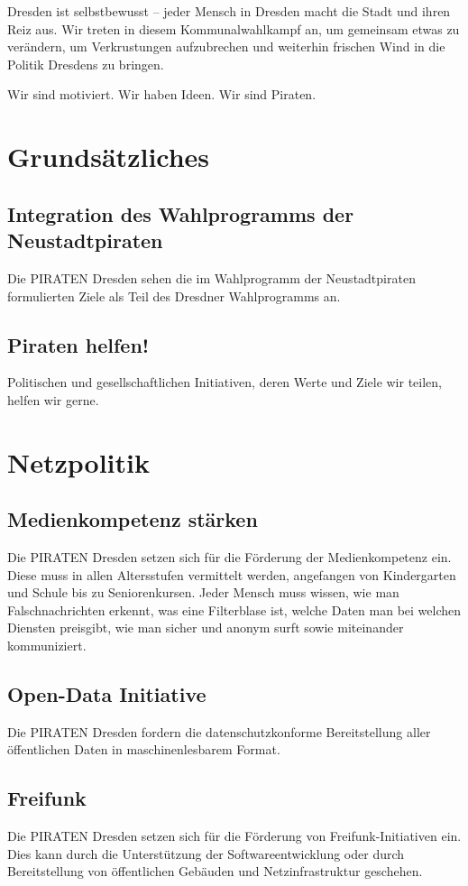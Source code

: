 \documentclass[a4paper, 11pt]{article}
\begin{document}
Dresden ist selbstbewusst – jeder Mensch in Dresden macht die Stadt und ihren Reiz aus. Wir treten in diesem Kommunalwahlkampf an, um gemeinsam etwas zu verändern, um Verkrustungen aufzubrechen und weiterhin frischen Wind in die Politik Dresdens zu bringen.\newline

Wir sind motiviert. Wir haben Ideen. Wir sind Piraten.

\section{Grundsätzliches}
\subsection{Integration des Wahlprogramms der Neustadtpiraten}
Die PIRATEN Dresden sehen die im Wahlprogramm der Neustadtpiraten formulierten Ziele als Teil des Dresdner Wahlprogramms an.

\subsection{Piraten helfen!}
Politischen und gesellschaftlichen Initiativen, deren Werte und Ziele wir teilen, helfen wir gerne.

\section{Netzpolitik}

\subsection{Medienkompetenz stärken}
Die PIRATEN Dresden setzen sich für die Förderung der Medienkompetenz ein. Diese muss in allen Altersstufen vermittelt werden, angefangen von Kindergarten und Schule bis zu Seniorenkursen. Jeder Mensch muss wissen, wie man Falschnachrichten erkennt, was eine Filterblase ist, welche Daten man bei welchen Diensten preisgibt, wie man sicher und anonym surft sowie miteinander kommuniziert.


\subsection{Open-Data Initiative}
Die PIRATEN Dresden fordern die datenschutzkonforme Bereitstellung aller öffentlichen Daten in maschinenlesbarem Format.

\subsection{Freifunk}
Die PIRATEN Dresden setzen sich für die Förderung von Freifunk-Initiativen ein. Dies kann durch die Unterstützung der Softwareentwicklung oder durch Bereitstellung von öffentlichen Gebäuden und Netzinfrastruktur geschehen.
\end{document}
